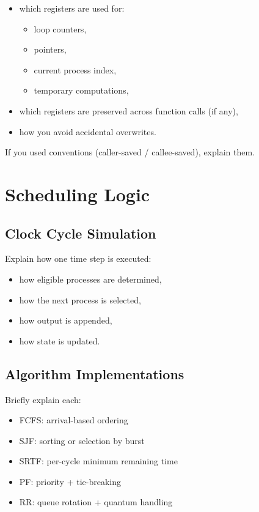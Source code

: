 \documentclass[a4paper,12pt]{article}
\begin{document}
\begin{itemize}
\item which registers are used for:
    \begin{itemize}
    \item loop counters,
    \item pointers,
    \item current process index,
    \item temporary computations,
    \end{itemize}
\item which registers are preserved across function calls (if any),
\item how you avoid accidental overwrites.
\end{itemize}

If you used conventions (caller-saved / callee-saved), explain them.

\section{Scheduling Logic}

\subsection{Clock Cycle Simulation}

Explain how one time step is executed:

\begin{itemize}
\item how eligible processes are determined,
\item how the next process is selected,
\item how output is appended,
\item how state is updated.
\end{itemize}

\subsection{Algorithm Implementations}

Briefly explain each:

\begin{itemize}
\item FCFS: arrival-based ordering
\item SJF: sorting or selection by burst
\item SRTF: per-cycle minimum remaining time
\item PF: priority + tie-breaking
\item RR: queue rotation + quantum handling
\end{itemize}
\end{document}
